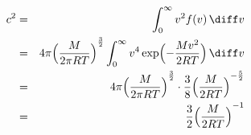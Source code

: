 \begin{eqnarray*}
c^2
&=&
\int_{0}^{\infty} 
    v^2 f(v)
\,\diff v 
\\ &=&
4\pi {
    \Bigl(
        \frac{M}{2\pi RT}
    \Bigr) 
}^\frac{3}{2} 
\int_{0}^{\infty} 
    v^4 
\exp 
\Bigl( 
  - \frac{Mv^{2}}{2RT} 
\Bigr) 
\,\diff v
\\ &=&
4\pi {
  \Bigl(
    \frac{M}{2\pi RT}
    \Bigr) 
}^\frac{3}{2} 
\cdot
\frac{3}{8}
    {
        \Bigl(
            \frac{M}{2 RT}
        \Bigr) 
    }^{-\frac{5}{2}} 
\\ &=&
\frac{3}{2}
{
    \Bigl(
        \frac{M}{2 RT}
    \Bigr) 
}^{-1} 
\label{}
\end{eqnarray*}